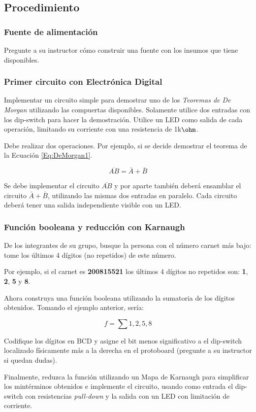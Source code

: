 \subsection{Procedimiento}
\subsubsection{Fuente de alimentación}
Pregunte a su instructor cómo construir una fuente con los insumos que tiene disponibles.

\subsubsection{Primer circuito con Electrónica Digital}
Implementar un circuito simple para demostrar uno de los \emph{Teoremas de De Morgan} utilizando las compuertas disponibles.
Solamente utilice dos entradas con los dip-switch para hacer la demostración.
Utilice un LED como salida de cada operación, limitando su corriente con una resistencia de 1k$\ohm$.

Debe realizar dos operaciones. Por ejemplo, si se decide demostrar el teorema de la Ecuación \ref{Eq:DeMorgan1}.

\begin{equation}
    \overline{A B} = \bar{A} + \bar{B}
    \label{Eq:DeMorgan1}
\end{equation}

Se debe implementar el circuito $\overline{A B}$ y por aparte también deberá ensamblar el circuito $\bar{A} + \bar{B}$, utilizando las mismas dos entradas en paralelo.
Cada circuito deberá tener una salida independiente visible con un LED.

\subsubsection{Función booleana y reducción con Karnaugh}
De los integrantes de su grupo, busque la persona con el número carnet más bajo: tome los últimos 4 dígitos (no repetidos) de este número.

\vspace{14pt}

Por ejemplo, si el carnet es \textbf{200815521} los últimos 4 dígitos no repetidos son: \textbf{1}, \textbf{2}, \textbf{5} y \textbf{8}.

\vspace{14pt}

Ahora construya una función booleana utilizando la sumatoria de los dígitos obtenidos. Tomando el ejemplo anterior, sería:

$$ f = \sum{1,2,5,8} $$

Codifique los dígitos en BCD y asigne el bit menos significativo a el dip-switch localizado físicamente más a la derecha en el protoboard 
(pregunte a su instructor si quedan dudas).

\vspace{14pt}

Finalmente, reduzca la función utilizando un Mapa de Karnaugh para simplificar los mintérminos obtenidos e implemente el circuito, usando como entrada 
el dip-switch con resistencias \emph{pull-down} y la salida con un LED con limitación de corriente.

